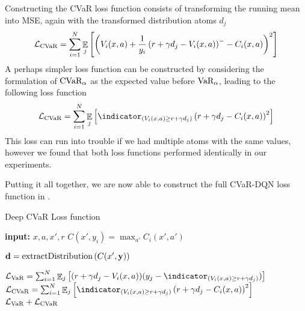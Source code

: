 Constructing the CVaR loss function consists of transforming the running mean into MSE, again with the transformed distribution atoms $d_j$
\begin{equation}
\mathcal{L}_{\text{CVaR}}=\sum_{i=1}^{N} \mathop{\mathbb{E}}_j\left[ {\left( {V_i(x, a) + \frac{1}{y_i} \left( {r + \gamma d_j - V_i(x, a)} \right)^- - C_i(x, a)} \right)^2} \right]
\end{equation}
A perhaps simpler loss function can be constructed by considering the formulation of $\text{CVaR}_\alpha$ as the expected value before $\text{VaR}_\alpha$, leading to the following loss function
\begin{equation}
\mathcal{L}_{\cvar}=\sum_{i=1}^{N} \expect_j\bsquare{\indicator_{(V_i(x, a) \ge r + \gamma d_j)}\bround{r + \gamma d_j - C_i(x, a)}^2}
\end{equation}
This loss can run into trouble if we had multiple atoms with the same values, however we found  that both loss functions performed identically in our experiments.

Putting it all together, we are now able to construct the full CVaR-DQN loss function in .

\begin{algorithm}
\caption{Deep CVaR Loss function}
\begin{algorithmic}\label{alg:cvardqnloss}

    \STATE \textbf{input:} $x, a, x', r$
    \bindent
	\STATE $C(x', y_i) = \max_{a'} C_i(x', a')$
	\ENDFOR
	
	\STATE $\mathbf{d}= \text{extractDistribution}\left( {C(x', \mathbf{y})} \right)$

	
	\STATE $\mathcal{L}_{\var}=\sum_{i=1}^{N} \expect_j\bsquare{(r + \gamma d_j - V_i(x, a))(y_j - \indicator_{(V_i(x, a) \ge r + \gamma d_j)})}$
	\STATE $\mathcal{L}_{\cvar}=\sum_{i=1}^{N} \expect_j\bsquare{\indicator_{(V_i(x, a) \ge r + \gamma d_j)}\bround{r + \gamma d_j - C_i(x, a)}^2}$
	\eindent
	\RETURN $\mathcal{L}_{\text{VaR}} + \mathcal{L}_{\text{CVaR}}$
	
\end{algorithmic}
\end{algorithm}

